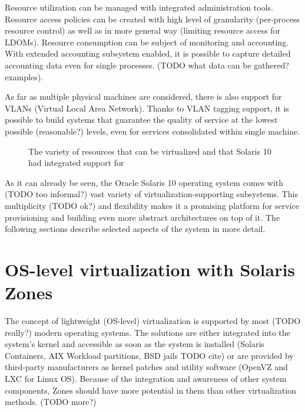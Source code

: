 \documentclass[11pt]{book}
\begin{document}
      Resource utilization can be managed with integrated administration tools. Resource access policies can be created with high
      level of granularity (per-process resource control) as well as in more general way (limiting resource access for
      LDOMs). Resource consumption can be subject of monitoring and accounting. With extended accounting subsystem
      enabled, it is possible to capture detailed accounting data even for single processes. (TODO what data can be gathered?
      examples).

      As far as multiple physical machines are considered, there is also support for VLANs (Virtual Local Area Network).
      Thanks to VLAN tagging support, it is possible to build systems that guarantee the quality of service at the
      lowest possible (reasonable?) levels, even for services consolidated within single machine.

      \begin{figure}[H]

        \caption{The variety of resources that can be virtualized and that Solaris 10 had integrated support for}
      \end{figure}




      As it can already be seen, the Oracle Solaris 10 operating system comes with (TODO too informal?) vast variety
      of virtualization-supporting subsystems. This multiplicity (TODO ok?) and flexibility makes it a promising
      platform for service provisioning and building even more abstract architectures on top of it. The following
      sections describe selected aspects of the system in more detail.


    \section{OS-level virtualization with Solaris Zones}
    \label{sec:sol:containers}



      The concept of lightweight (OS-level) virtualization is supported by most (TODO really?)
      modern operating systems. The solutions are either integrated into the system's kernel and accessible as soon as
      the system is installed (Solaris Containers, AIX
      Workload partitions, BSD jails TODO cite) or are provided by third-party manufacturers as kernel patches and utility
      software (OpenVZ and LXC for Linux OS). Because of the integration and awareness of other system components, Zones
      should have more potential in them than other virtualization methods. (TODO more?)
\end{document}
